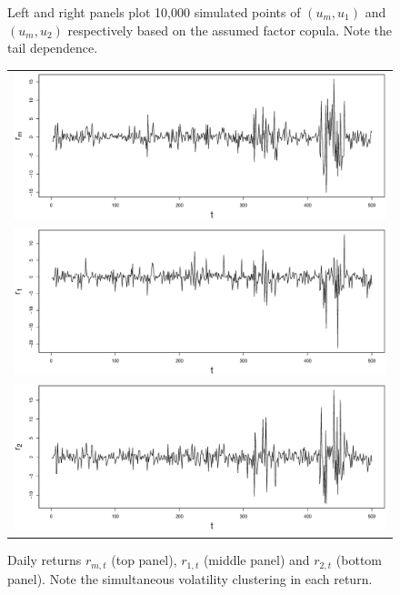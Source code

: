 \documentclass[authoryear]{elsarticle}
\begin{document}
\begin{figure}
\begin{center}
\begin{tabular}{cc}
    \end{tabular}
    \caption{Left and right panels  plot 10,000 simulated points of $(u_m,u_1)$ and $(u_m,u_2)$ respectively based on the assumed factor copula. Note the tail dependence.}
    \label{finterpretation}
  \end{center}
\end{figure}


\begin{figure}
  \begin{center}
    \begin{tabular}{c}
      {\includegraphics[scale=0.35]{marketreturn.eps}} \\
       {\includegraphics[scale=0.35]{return1.eps}} \\
        {\includegraphics[scale=0.35]{return2.eps}} \\
     \end{tabular}
    \caption{Daily returns $r_{m,t}$ (top panel), $r_{1,t}$ (middle panel) and $r_{2,t}$ (bottom panel). Note the simultaneous volatility clustering in each return.}
    \label{finterpretation}
  \end{center}
\end{figure}
\end{document}
